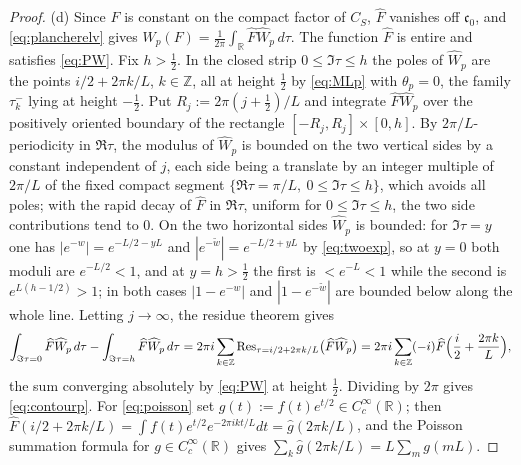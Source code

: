 \documentclass[11pt]{amsart}
\theoremstyle{definition}
\theoremstyle{remark}
\newcommand{\R}{\mathbb R}
\newcommand{\Z}{\mathbb Z}
\newcommand{\Res}{\operatorname{Res}}
\newcommand{\Wh}{\widehat{W}}
\begin{document}
\begin{proof}
(d)  Since $F$ is constant on the compact factor of $C_S$, $\widehat F$
vanishes off $\mathfrak c_0$, and \eqref{eq:plancherelv} gives
$W_p(F)=\tfrac1{2\pi}\int_{\R}\widehat F\Wh_p\,d\tau$.  The function
$\widehat F$ is entire and satisfies \eqref{eq:PW}.
Fix $h>\tfrac12$.  In the closed strip $0\le\Im\tau\le h$ the poles of
$\Wh_p$ are the points $i/2+2\pi k/L$, $k\in\Z$, all at height
$\tfrac12$ by \eqref{eq:MLp} with $\theta_p=0$, the family $\tau_k^{-}$ lying
at height $-\tfrac12$.  Put $R_j:=2\pi(j+\tfrac12)/L$ and integrate
$\widehat F\Wh_p$ over the positively oriented boundary of the rectangle
$[-R_j,R_j]\times[0,h]$.  By $2\pi/L$-periodicity in $\Re\tau$, the modulus of
$\Wh_p$ is bounded on the two vertical sides by a constant independent of $j$,
each side being a translate by an integer multiple of $2\pi/L$ of the fixed
compact segment $\{\Re\tau=\pi/L,\ 0\le\Im\tau\le h\}$, which avoids all poles;
with the rapid decay of $\widehat F$ in $\Re\tau$, uniform for
$0\le\Im\tau\le h$, the two side contributions tend to $0$.  On the two
horizontal sides $\Wh_p$ is bounded: for $\Im\tau=y$ one has
$|e^{-w}|=e^{-L/2-yL}$ and $|e^{-\tilde w}|=e^{-L/2+yL}$ by \eqref{eq:twoexp},
so at $y=0$ both moduli are $e^{-L/2}<1$, and at $y=h>\tfrac12$ the first is
$<e^{-L}<1$ while the second is $e^{L(h-1/2)}>1$; in both cases $|1-e^{-w}|$
and $|1-e^{-\tilde w}|$ are bounded below along the whole line.  Letting
$j\to\infty$, the residue theorem gives
\[
\int_{\Im\tau=0}\widehat F\Wh_p\,d\tau-\int_{\Im\tau=h}\widehat F\Wh_p\,d\tau
=2\pi i\sum_{k\in\Z}\Res_{\tau=i/2+2\pi k/L}\bigl(\widehat F\Wh_p\bigr)
=2\pi i\sum_{k\in\Z}(-i)\widehat F\Bigl(\frac i2+\frac{2\pi k}{L}\Bigr),
\]
the sum converging absolutely by \eqref{eq:PW} at height $\tfrac12$.
Dividing by $2\pi$ gives \eqref{eq:contourp}.  For \eqref{eq:poisson} set
$g(t):=f(t)e^{t/2}\in C_c^{\infty}(\R)$; then
$\widehat F(i/2+2\pi k/L)=\int f(t)e^{t/2}e^{-2\pi ikt/L}dt=\widehat g(2\pi k/L)$,
and the Poisson summation formula \cite[Theorem~7.2.1]{Hormander} for
$g\in C_c^{\infty}(\R)$ gives $\sum_k\widehat g(2\pi k/L)=L\sum_mg(mL)$.


\end{proof}
\end{document}
